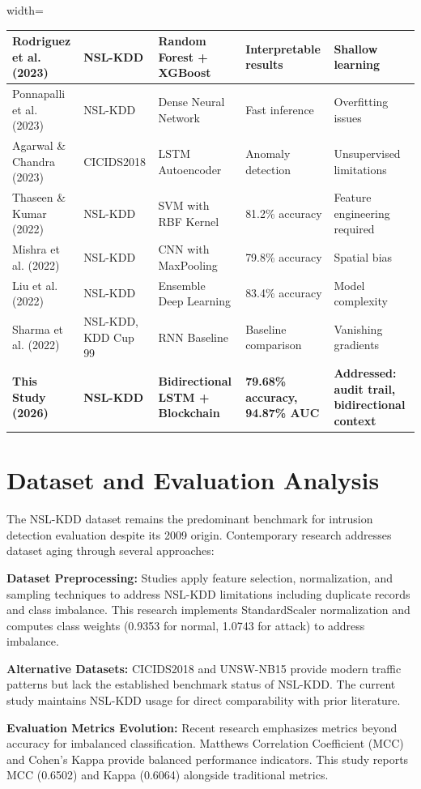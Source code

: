 \documentclass[12pt,a4paper]{report}
\begin{document}
\begin{adjustbox}{width=\textwidth}
\begin{longtable}{lllll}
\midrule
Rodriguez et al. (2023) & NSL-KDD & Random Forest + XGBoost & Interpretable results & Shallow learning \\
\midrule
Ponnapalli et al. (2023) & NSL-KDD & Dense Neural Network & Fast inference & Overfitting issues \\
\midrule
Agarwal \& Chandra (2023) & CICIDS2018 & LSTM Autoencoder & Anomaly detection & Unsupervised limitations \\
\midrule
Thaseen \& Kumar (2022) & NSL-KDD & SVM with RBF Kernel & 81.2\% accuracy & Feature engineering required \\
\midrule
Mishra et al. (2022) & NSL-KDD & CNN with MaxPooling & 79.8\% accuracy & Spatial bias \\
\midrule
Liu et al. (2022) & NSL-KDD & Ensemble Deep Learning & 83.4\% accuracy & Model complexity \\
\midrule
Sharma et al. (2022) & NSL-KDD, KDD Cup 99 & RNN Baseline & Baseline comparison & Vanishing gradients \\
\midrule
\textbf{This Study (2026)} & \textbf{NSL-KDD} & \textbf{Bidirectional LSTM + Blockchain} & \textbf{79.68\% accuracy, 94.87\% AUC} & \textbf{Addressed: audit trail, bidirectional context} \\
\end{longtable}
\end{adjustbox}

\section{Dataset and Evaluation Analysis}

The NSL-KDD dataset remains the predominant benchmark for intrusion detection evaluation despite its 2009 origin. Contemporary research addresses dataset aging through several approaches:

\textbf{Dataset Preprocessing:} Studies apply feature selection, normalization, and sampling techniques to address NSL-KDD limitations including duplicate records and class imbalance. This research implements StandardScaler normalization and computes class weights (0.9353 for normal, 1.0743 for attack) to address imbalance.

\textbf{Alternative Datasets:} CICIDS2018 and UNSW-NB15 provide modern traffic patterns but lack the established benchmark status of NSL-KDD. The current study maintains NSL-KDD usage for direct comparability with prior literature.

\textbf{Evaluation Metrics Evolution:} Recent research emphasizes metrics beyond accuracy for imbalanced classification. Matthews Correlation Coefficient (MCC) and Cohen's Kappa provide balanced performance indicators. This study reports MCC (0.6502) and Kappa (0.6064) alongside traditional metrics.
\end{document}
